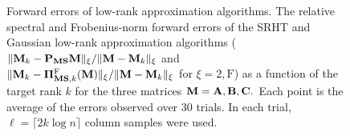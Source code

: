 \begin{figure}[htp]
 \caption[Forward errors of low-rank approximation algorithms]{
 {\sc Forward errors of low-rank approximation algorithms.} The 
 relative spectral and Frobenius-norm forward errors of the SRHT and Gaussian low-rank approximation algorithms
 ($\mbox{}\|\mathbf{M}_k - \mathbf{P}_{\mathbf{M}\mathbf{S}} \mathbf{M}\|_{\xi}/\mbox{}\|\mathbf{M} - \mathbf{M}_k\|_{\xi}$ 
 and $\mbox{}\|\mathbf{M}_k - \boldsymbol{\Pi}_{\mathbf{M}\mathbf{S}, k}^{\mathrm{F}}(\mathbf{M})\|_{\xi}/\mbox{}\|\mathbf{M} - \mathbf{M}_k\|_{\xi}$ 
 for $\xi = 2, \mathrm{F}$)
 as a function of the target rank $k$ for the three matrices $\mathbf{M} = \mathbf{A}, \mathbf{B}, \mathbf{C}.$ Each point is the average of the errors observed over 30 trials.
 In each trial, $\ell = \lceil 2 k \log n \rceil$ column samples were used.}
 \label{ch3:fig:forwarderrors}
\end{figure}

